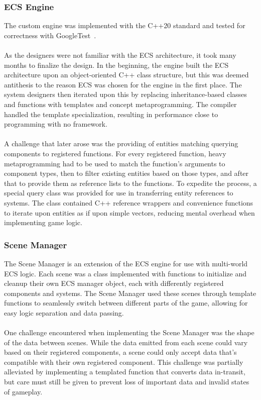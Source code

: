 \subsubsection*{ECS Engine}
The custom engine was implemented with the C++20 standard and tested for correctness with GoogleTest~\cite{GoogleTest}.
\\\\
As the designers were not familiar with the ECS architecture, it took many months to finalize the design.
In the beginning, the engine built the ECS architecture upon an object-oriented C++ class structure, but this was deemed
antithesis to the reason ECS was chosen for the engine in the first place.
The system designers then iterated upon this by replacing inheritance-based classes and functions with templates
and concept metaprogramming.
The compiler handled the template specialization, resulting in performance close to programming with no framework.
\\\\
A challenge that later arose was the providing of entities matching querying components to registered functions.
For every registered function, heavy metaprogramming had to be used to match the function's arguments to component types,
then to filter existing entities based on those types, and after that to provide them as reference lists to the functions.
To expedite the process, a special query class was provided for use in transferring entity references to systems.
The class contained C++ reference wrappers and convenience functions to iterate upon entities as if upon simple vectors,
reducing mental overhead when implementing game logic.

\subsubsection*{Scene Manager}
The Scene Manager is an extension of the ECS engine for use with multi-world ECS logic.
Each scene was a class implemented with functions to initialize and cleanup their own ECS manager object, each with
differently registered components and systems.
The Scene Manager used these scenes through template functions to seamlessly switch between different parts of the game,
allowing for easy logic separation and data passing.
\\\\
One challenge encountered when implementing the Scene Manager was the shape of the data between scenes.
While the data emitted from each scene could vary based on their registered components, a scene could only
accept data that's compatible with their own registered component.
This challenge was partially alleviated by implementing a templated function that converts data in-transit, but
care must still be given to prevent loss of important data and invalid states of gameplay.

